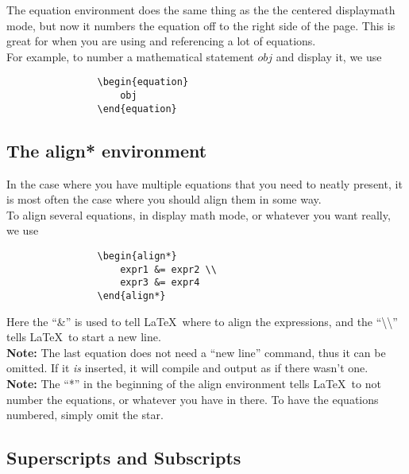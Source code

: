 \documentclass[11pt,letterpaper,twoside,titlepage]{article}
\newcommand{\latex}{\LaTeX \ }
\begin{document}
			The equation environment does the same thing as the the centered displaymath mode, but now it numbers the equation off to the right side of the page.  This is great for when you are using and referencing a lot of equations. \\
			
			For example, to number a mathematical statement $obj$ and display it, we use
			
			\begin{verbatim}
				\begin{equation}
					obj
				\end{equation}
			\end{verbatim}
			
		\subsection{The align* environment}
		
			In the case where you have multiple equations that you need to neatly present, it is most often the case where you should align them in some way. \\
			
			To align several equations, in display math mode, or whatever you want really, we use
			
			\begin{verbatim}
				\begin{align*}
					expr1 &= expr2 \\
					expr3 &= expr4
				\end{align*}
			\end{verbatim}
			
			Here the ``\&'' is used to tell \latex where to align the expressions, and the ``\textbackslash \textbackslash'' tells \latex to start a new line. \\
			
			\textbf{Note:} The last equation does not need a ``new line'' command, thus it can be omitted.  If it \emph{is} inserted, it will compile and output as if there wasn't one. \\
			
			\textbf{Note:} The ``*'' in the beginning of the align environment tells \latex to not number the equations, or whatever you have in there.  To have the equations numbered, simply omit the star.
			
		\subsection{Superscripts and Subscripts}
		
\end{document}
